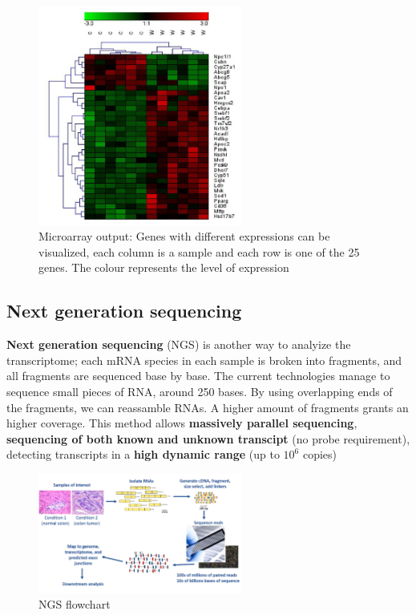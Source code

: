       \begin{figure}[ht]
      \caption{Microarray output: Genes with different expressions can be visualized, each column is a sample and each row is one of the 25 genes. The colour represents the level of expression}
      \centering
      \includegraphics[width=0.6\textwidth]{MicroRNAresults.PNG}
      \end{figure}

    \subsection{Next generation sequencing}
      \textbf{Next generation sequencing} (NGS) is another way to analyize the transcriptome; each mRNA species in each sample is broken into fragments, and all fragments are sequenced base by base. The current technologies manage to sequence small pieces of RNA, around 250 bases. By using overlapping ends of the fragments, we can reassamble RNAs. A higher amount of fragments grants an higher coverage. This method allows \textbf{massively parallel sequencing}, \textbf{sequencing of both known and unknown transcipt} (no probe requirement), detecting transcripts in a \textbf{high dynamic range} (up to $10^6$ copies)

      \begin{figure}[ht]
      \caption{NGS flowchart}
      \centering
      \includegraphics[width=0.6\textwidth]{TranscriptomicsNextGenSeq.PNG}
      \end{figure}

